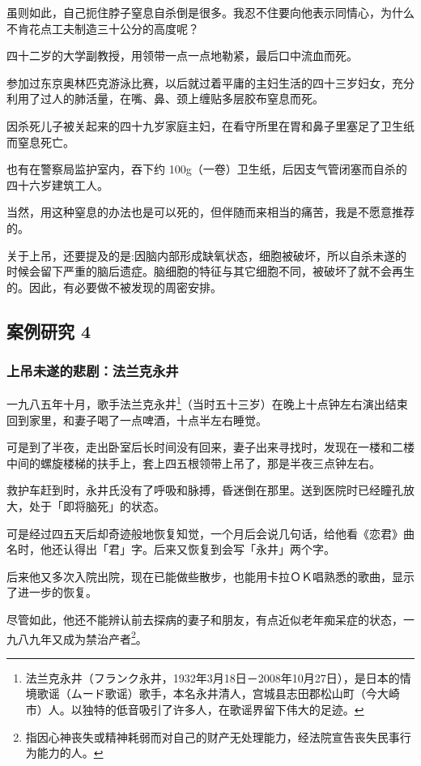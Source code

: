 \documentclass[UTF8]{ctexart}
\begin{document}
虽则如此，自己扼住脖子窒息自杀倒是很多。我忍不住要向他表示同情心，为什么不肯花点工夫制造三十公分的高度呢？

四十二岁的大学副教授，用领带一点一点地勒紧，最后口中流血而死。

参加过东京奥林匹克游泳比赛，以后就过着平庸的主妇生活的四十三岁妇女，充分利用了过人的肺活量，在嘴、鼻、颈上缠贴多层胶布窒息而死。

因杀死儿子被关起来的四十九岁家庭主妇，在看守所里在胃和鼻子里塞足了卫生纸而窒息死亡。

也有在警察局监护室内，吞下约 100g（一卷）卫生纸，后因支气管闭塞而自杀的四十六岁建筑工人。

当然，用这种窒息的办法也是可以死的，但伴随而来相当的痛苦，我是不愿意推荐的。

关于上吊，还要提及的是:因脑内部形成缺氧状态，细胞被破坏，所以自杀未遂的时候会留下严重的脑后遗症。脑细胞的特征与其它细胞不同，被破坏了就不会再生的。因此，有必要做不被发现的周密安排。

\subsection{案例研究 4}
\subsubsection*{上吊未遂的悲剧：法兰克永井}

一九八五年十月，歌手法兰克永井\footnote{法兰克永井（フランク永井，1932年3月18日－2008年10月27日），是日本的情境歌谣（ムード歌谣）歌手，本名永井清人，宫城县志田郡松山町（今大崎市）人。以独特的低音吸引了许多人，在歌谣界留下伟大的足迹。}（当时五十三岁）在晚上十点钟左右演出结束回到家里，和妻子喝了一点啤酒，十点半左右睡觉。

可是到了半夜，走出卧室后长时间没有回来，妻子出来寻找时，发现在一楼和二楼中间的螺旋楼梯的扶手上，套上四五根领带上吊了，那是半夜三点钟左右。

救护车赶到时，永井氏没有了呼吸和脉搏，昏迷倒在那里。送到医院时已经瞳孔放大，处于「即将脑死」的状态。

可是经过四五天后却奇迹般地恢复知觉，一个月后会说几句话，给他看《恋君》曲名时，他还认得出「君」字。后来又恢复到会写「永井」两个字。

后来他又多次入院出院，现在已能做些散步，也能用卡拉ＯＫ唱熟悉的歌曲，显示了进一步的恢复。

尽管如此，他还不能辨认前去探病的妻子和朋友，有点近似老年痴呆症的状态，一九八九年又成为禁治产者\footnote{指因心神丧失或精神耗弱而对自己的财产无处理能力，经法院宣告丧失民事行为能力的人。 }。
\end{document}
